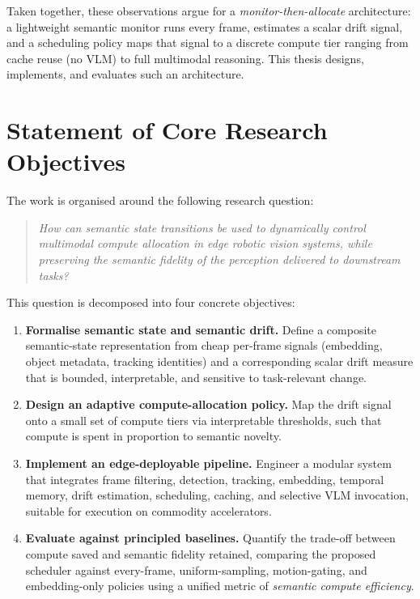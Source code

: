 Taken together, these observations argue for a \emph{monitor-then-allocate}
architecture: a lightweight semantic monitor runs every frame, estimates a
scalar drift signal, and a scheduling policy maps that signal to a discrete
compute tier ranging from cache reuse (no VLM) to full multimodal reasoning.
This thesis designs, implements, and evaluates such an architecture.

\section{Statement of Core Research Objectives}
\label{sec:intro-objectives}

The work is organised around the following research question:

\begin{quote}
\itshape How can semantic state transitions be used to dynamically control
multimodal compute allocation in edge robotic vision systems, while
preserving the semantic fidelity of the perception delivered to downstream
tasks?
\end{quote}

This question is decomposed into four concrete objectives:

\begin{enumerate}
  \item \textbf{Formalise semantic state and semantic drift.} Define a
  composite semantic-state representation from cheap per-frame signals
  (embedding, object metadata, tracking identities) and a corresponding
  scalar drift measure that is bounded, interpretable, and sensitive to
  task-relevant change.
  \item \textbf{Design an adaptive compute-allocation policy.} Map the drift
  signal onto a small set of compute tiers via interpretable thresholds, such
  that compute is spent in proportion to semantic novelty.
  \item \textbf{Implement an edge-deployable pipeline.} Engineer a modular
  system that integrates frame filtering, detection, tracking, embedding,
  temporal memory, drift estimation, scheduling, caching, and selective VLM
  invocation, suitable for execution on commodity accelerators.
  \item \textbf{Evaluate against principled baselines.} Quantify the
  trade-off between compute saved and semantic fidelity retained, comparing
  the proposed scheduler against every-frame, uniform-sampling, motion-gating,
  and embedding-only policies using a unified metric of \emph{semantic compute
  efficiency}.
\end{enumerate}

